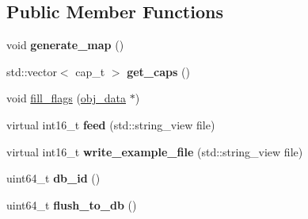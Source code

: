 \subsection*{Public Member Functions}
\begin{DoxyCompactItemize}
\item 
\mbox{\label{structmods_1_1yaml_1_1explosive__description__t_add4c99076a59766e1ba08096866cae4a}} 
void {\bfseries generate\+\_\+map} ()
\item 
\mbox{\label{structmods_1_1yaml_1_1explosive__description__t_a45fd25bf6228ba54f97007b98972fa3b}} 
std\+::vector$<$ cap\+\_\+t $>$ {\bfseries get\+\_\+caps} ()
\item 
void \hyperlink{structmods_1_1yaml_1_1explosive__description__t_aae46a6116153a99335c13843f59ae63f}{fill\+\_\+flags} (\hyperlink{structobj__data}{obj\+\_\+data} $\ast$)
\item 
\mbox{\label{structmods_1_1yaml_1_1explosive__description__t_aea51c158dd30bd83300cddc5a7edb315}} 
virtual int16\+\_\+t {\bfseries feed} (std\+::string\+\_\+view file)
\item 
\mbox{\label{structmods_1_1yaml_1_1explosive__description__t_a7df1c750a7ae44cccfe84bd70e0d43f7}} 
virtual int16\+\_\+t {\bfseries write\+\_\+example\+\_\+file} (std\+::string\+\_\+view file)
\item 
\mbox{\label{structmods_1_1yaml_1_1explosive__description__t_a7fdbedb2b6c92f89795639d510a28065}} 
uint64\+\_\+t {\bfseries db\+\_\+id} ()
\item 
\mbox{\label{structmods_1_1yaml_1_1explosive__description__t_a582dc3f531a50342150800bba1de0fdb}} 
uint64\+\_\+t {\bfseries flush\+\_\+to\+\_\+db} ()
\end{DoxyCompactItemize}
